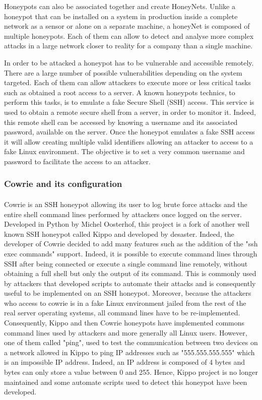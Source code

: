 Honeypots can also be associated together and create HoneyNets. Unlike a honeypot that can
be installed on a system in production inside a complete network as a sensor or alone on a
separate machine, a honeyNet is composed of multiple honeypots. Each of them can allow to
detect and analyse more complex attacks in a large network closer to reality for a company
than a single machine.

In order to be attacked a honeypot has to be vulnerable and accessible remotely. There are a
large number of possible vulnerabilities depending on the system targeted. Each of them can
allow attackers to execute more or less critical tasks such as obtained a root access to
a server. A known honeypots technics, to perform this tasks, is to emulate a fake Secure Shell
(SSH) access. This service is used to obtain a remote secure shell from a server, in order
to monitor it. Indeed, this remote shell can be accessed by knowing a username and its 
associated password, available on the server. Once the honeypot emulates a fake SSH access it
will allow creating multiple valid identifiers allowing an attacker to access to a fake 
Linux environment. The objective is to set a very common username and password to facilitate 
the access to an attacker.

\subsubsection{Cowrie and its configuration} %

\paragraph{} 

Cowrie is an SSH honeypot allowing its user to log brute force attacks and the entire shell 
command lines performed by attackers once logged on the server. Developed in Python by 
Michel Oosterhof, this project is a fork of another well known SSH honeypot called Kippo and
developed by desaster. Indeed, the developer of Cowrie decided to add many features such as
the addition of the "ssh exec commands" support. Indeed, it is possible to execute command 
lines through SSH after being connected or execute a single command line remotely, without 
obtaining a full shell but only the output of its command. This is commonly used by attackers 
that developed scripts to automate their attacks and is consequently useful to be implemented
on an SSH honeypot.
Moreover, because the attackers who access to cowrie is in a fake Linux environment jailed from
the rest of the real server operating systems, all command lines have to be re-implemented. 
Consequently, Kippo and then Cowrie honeypots have implemented commons command lines used by
attackers and more generally all Linux users. However, one of them called "ping", used to 
test the communication between two devices on a network allowed in Kippo to ping IP addresses
such as "555.555.555.555" which is an impossible IP address. Indeed, an IP address is composed
of 4 bytes and bytes can only store a value between 0 and 255. Hence, Kippo project is no longer
 maintained and some automate scripts used to detect this honeypot have been developed.

